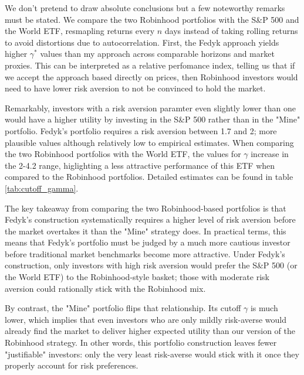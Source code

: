 We don't pretend to draw absolute conclusions but a few noteworthy remarks must be stated.
We compare the two Robinhood portfolios with the S\&P 500 and the World ETF, resmapling returns every $n$ days instead of taking rolling returns to avoid distortions due to autocorrelation. 
First, the Fedyk approach yields higher $\gamma^*$ values than my approach across comparable horizons and market proxies.
This can be interpreted as a relative perfomance index, telling us that if we accept the approach based directly on prices, then Robinhood investors would need to have lower risk aversion 
to not be convinced to hold the market.

Remarkably, investors with a risk aversion paramter even slightly lower than one would have a higher utility by investing in the S\&P 500 rather than in the "Mine" portfolio.
Fedyk's portfolio requires a risk aversion between 1.7 and 2; more plausible values although relatively low to empirical estimates.
When comparing the two Robinhood portfolios with the World ETF, the values for $\gamma$ increase in the 2-4.2 range, 
higlighting a less attractive performance of this ETF when compared to the Robinhood portfolios.
Detailed estimates can be found in table \ref{tab:cutoff_gamma}.

The key takeaway from comparing the two Robinhood-based portfolios is that Fedyk's construction systematically requires a 
higher level of risk aversion before the market overtakes it than the "Mine" strategy does. 
In practical terms, this means that Fedyk's portfolio must be judged by a much more cautious investor before traditional market benchmarks become more attractive. 
Under Fedyk's construction, only investors with high risk aversion would prefer the S\&P 500 (or the World ETF) to the Robinhood-style basket; those with moderate risk aversion could rationally stick with the Robinhood mix.

By contrast, the "Mine" portfolio flips that relationship. 
Its cutoff $\gamma$ is much lower, which implies that even investors who are only mildly risk-averse would already find the market to deliver higher expected utility than our version of the Robinhood strategy. 
In other words, this portfolio construction leaves fewer "justifiable" investors: only the very least risk-averse would stick with it once they properly account for risk preferences.



